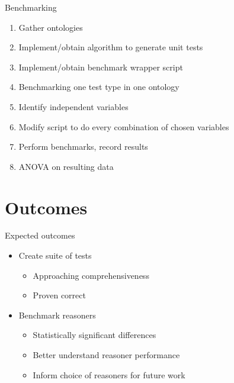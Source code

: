 \documentclass[17pt,mathserif]{beamer}
\begin{document}
\begin{frame}[allowframebreaks]{Benchmarking}
  \begin{enumerate}
    \item Gather ontologies
    \item Implement/obtain algorithm to generate unit tests
    \item Implement/obtain benchmark wrapper script
    \item Benchmarking one test type in one ontology
    \item Identify independent variables
    \item Modify script to do every combination of chosen variables
    \item Perform benchmarks, record results
    \item ANOVA on resulting data
  \end{enumerate}
\end{frame}

\section{Outcomes}

\begin{frame}{Expected outcomes}
  \begin{itemize}
    \item Create suite of tests
    \begin{itemize}
      \item Approaching comprehensiveness
      \item Proven correct
    \end{itemize}
    \item Benchmark reasoners
    \begin{itemize}
      \item Statistically significant differences
      \item Better understand reasoner performance
      \item Inform choice of reasoners for future work
    \end{itemize}
  \end{itemize}
\end{frame}
\end{document}

